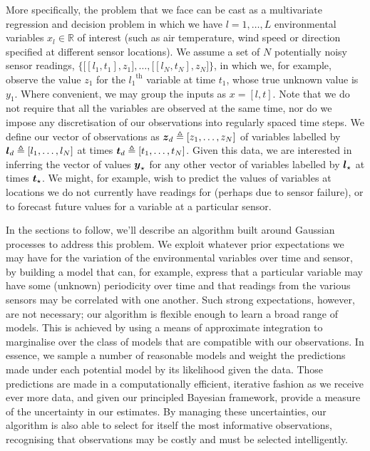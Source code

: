 \documentclass{acmsmall}
\begin{document}
More specifically, the problem that we face can be cast as a multivariate regression and decision problem in which we have $l=1,\ldots, L$ environmental variables $x_l \in \mathbb{R}$ of interest (such as air temperature, wind speed or direction specified at different sensor locations). We assume a set of $N$ potentially noisy sensor readings, $ \bigl\{\bigl[[l_1,t_1],z_1\bigr],\ldots,\bigl[[l_N,t_N],z_N\bigr]\bigr\}$, in which we, for example, observe the value $z_1$ for the ${l_1}^\text{th}$ variable at time $t_1$, whose true unknown value is $y_1$. Where convenient, we may group the inputs as $x=[l,t]$. Note that we do not require that all the variables are observed at the same time, nor do we impose any discretisation of our observations into regularly spaced time steps. We define our vector of observations as $\boldsymbol{z}_d\triangleq[z_1,\ldots,z_N]$ of variables labelled by $\boldsymbol{l}_d\triangleq[l_1,\ldots,l_N]$ at times $\boldsymbol{t}_d\triangleq[t_1,\ldots,t_N]$. Given this data, we are interested in inferring the vector of values $\boldsymbol{y}_\star$ for any other vector of variables labelled by $\boldsymbol{l}_\star$ at times $\boldsymbol{t}_\star$. We might, for example, wish to predict the values of variables at locations we do not currently have readings for (perhaps due to sensor failure), or to forecast future values for a variable at a particular sensor.  

In the sections to follow, we'll describe an algorithm built around Gaussian processes to address this problem. We exploit whatever prior expectations we may have for the variation of the environmental variables over time and sensor, by building a model that can, for example, express that a particular variable may have some (unknown) periodicity over time and that readings from the various sensors may be correlated with one another. Such strong expectations, however, are not necessary; our algorithm is flexible enough to learn a broad range of models. This is achieved by using a means of approximate integration to marginalise over the class of models that are compatible with our observations. In essence, we sample a number of reasonable models and weight the predictions made under each potential model by its likelihood given the data. Those predictions are made in a computationally efficient, iterative fashion as we receive ever more data, and given our principled Bayesian framework, provide a measure of the uncertainty in our estimates. By managing these uncertainties, our algorithm is also able to select for itself the most informative observations, recognising that observations may be costly and must be selected intelligently.  
\end{document}
